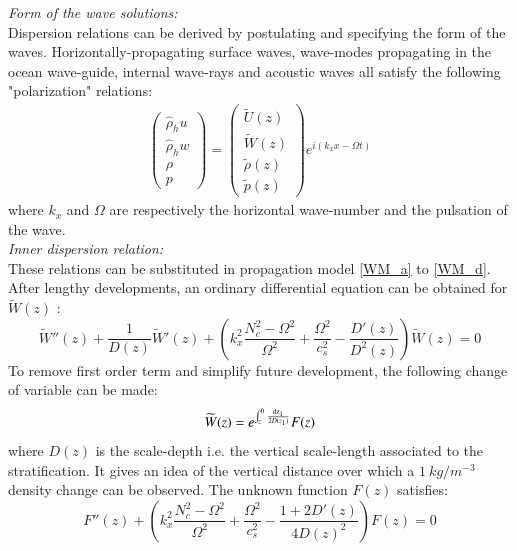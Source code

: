 \documentclass[a4paper,11pt]{article}
\begin{document}
\textit{Form of the wave solutions:}\\
Dispersion relations can be derived by postulating and specifying the form of the waves. Horizontally-propagating surface waves, wave-modes propagating in the ocean wave-guide, internal wave-rays and acoustic waves all satisfy the following "polarization" relations:
\label{SubSectionPropag}
\begin{subequations}
  \begin{alignat}{2}
  \displaystyle
  \left(
  \begin{array}{c}
    \hat{\rho}_h u\\
    \hat{\rho}_h w\\
    \rho\\
    p
  \end{array}
  \right)
  =
  \left(
  \begin{array}{c}
    \widetilde{U}(z)\\
    \widetilde{W}(z)\\
    \widetilde{\rho}(z)\\
    \widetilde{p}(z)
  \end{array}
  \right)
  e^{i(k_xx-\Omega t)}
\end{alignat}
\end{subequations}
where $k_x$ and $\Omega$ are respectively the horizontal wave-number and the pulsation of the wave. \\

\textit{Inner dispersion relation:}\\
These relations can be substituted in propagation model \ref{WM_a} to \ref{WM_d}.  After lengthy developments, an ordinary differential equation can be obtained for $ \widetilde{W}(z)$ :
\begin{equation}
  \displaystyle
  \widetilde{W}''(z)+\frac{1}{D(z)}\widetilde{W}'(z)
  +
  \left(
  k_x^2\frac{N_c^2-\Omega^2}{\Omega^2}+\frac{\Omega^2}{c_s^2}
  -\frac{D'(z)}{D^2(z)}
  \right)
  \widetilde{W}(z)=0
  \label{eqwfirst}
\end{equation}
To remove first order term and simplify future development, the following change of variable can be made:
\begin{equation}
  \displaystyle
  \widetilde{W}(z)=e^{\int_{z}^0{ \frac{\rm{d} z_1}{2D(z_1)} } }F(z)
  \label{CVF}
\end{equation}
where $D(z)$ is the scale-depth i.e. the vertical scale-length associated to the stratification. It gives an idea of the vertical distance over which a $1\ kg/m^{-3}$ density change can be observed.
The unknown function $F(z)$ satisfies:
\begin{equation}
  \displaystyle
  F''(z)
  +\left(
  k_x^2\frac{N_c^2-\Omega^2}{\Omega^2}
  +
  \frac{\Omega^2}{c_s^2}-\frac{1+2D'(z)}{4D(z)^2}
  \right)
  F(z)=0
  \label{eqF}
\end{equation}
\end{document}
